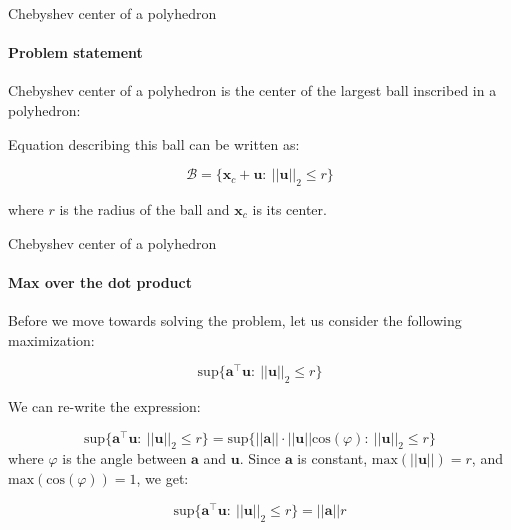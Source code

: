 \documentclass{beamer}
\begin{document}
\begin{frame}{Chebyshev center of a polyhedron}
\framesubtitle{Problem statement}
\begin{flushleft}

Chebyshev center of a polyhedron is the center of the largest ball inscribed in a polyhedron:

\begin{figure} [h!]
\begin{center}

\end{center} 
\end{figure}

Equation describing this ball can be written as:

\begin{equation}
    \mathcal{B} = \{ \mathbf{x}_c + \mathbf{u}: \ ||\mathbf{u}||_2 \leq r \}
\end{equation}

where $r$ is the radius of the ball and $\mathbf{x}_c$ is its center.
 
\end{flushleft}
\end{frame}



\begin{frame}{Chebyshev center of a polyhedron}
	\framesubtitle{Max over the dot product}
	\begin{flushleft}
		
		Before we move towards solving the problem, let us consider the following maximization: 
		
		\begin{equation}
			\text{sup} \{ \mathbf{a}^\top \mathbf{u}: \ ||\mathbf{u}||_2 \leq r \}
		\end{equation}
	
	We can re-write the expression:
	
		\begin{equation}
			\text{sup} \{ \mathbf{a}^\top \mathbf{u}: \ ||\mathbf{u}||_2 \leq r \}  = 
			\text{sup} \{ ||\mathbf{a}|| \cdot ||\mathbf{u}|| \text{cos}(\varphi): \ ||\mathbf{u}||_2 \leq r \}
		\end{equation}
%	
where $\varphi$ is the angle between $\mathbf{a}$ and $\mathbf{u}$. Since $\mathbf{a}$ is constant, $\text{max}(||\mathbf{u}||) = r$, and $\text{max}(\text{cos}(\varphi)) = 1$, we get:
	
	\begin{equation}
		\text{sup} \{ \mathbf{a}^\top \mathbf{u}: \ ||\mathbf{u}||_2 \leq r \}  = 
		 ||\mathbf{a}|| r
	\end{equation}
	
		
	\end{flushleft}
\end{frame}
\end{document}
